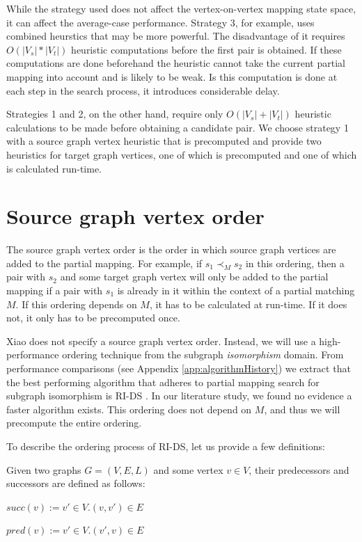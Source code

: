 While the strategy used does not affect the vertex-on-vertex mapping state space, it can affect the average-case performance. Strategy 3, for example, uses combined heurstics that may be more powerful. The disadvantage of it requires $O(|V_s|*|V_t|)$ heuristic computations before the first pair is obtained. If these computations are done beforehand the heuristic cannot take the current partial mapping into account and is likely to be weak. Is this computation is done at each step in the search process, it introduces considerable delay.

Strategies 1 and 2, on the other hand, require only $O(|V_s|+|V_t|)$ heuristic calculations to be made before obtaining a candidate pair. We choose strategy 1 with a source graph vertex heuristic that is precomputed and provide two heuristics for target graph vertices, one of which is precomputed and one of which is calculated run-time.

\section{Source graph vertex order}
\label{sec:sourceOrder}
The source graph vertex order is the order in which source graph vertices are added to the partial mapping. For example, if $s_1 \prec_M s_2$ in this ordering, then a pair with $s_2$ and some target graph vertex will only be added to the partial mapping if a pair with $s_1$ is already in it within the context of a partial matching $M$. If this ordering depends on $M$, it has to be calculated at run-time. If it does not, it only has to be precomputed once.

Xiao does not specify a source graph vertex order. Instead, we will use a high-performance ordering technique from the subgraph \textit{isomorphism} domain. From performance comparisons (see Appendix \ref{app:algorithmHistory}) we extract that the best performing algorithm that adheres to partial mapping search for subgraph isomorphism is RI-DS \cite{RIalgorithm}. In our literature study, we found no evidence a faster algorithm exists. This ordering does not depend on $M$, and thus we will precompute the entire ordering.

To describe the ordering process of RI-DS, let us provide a few definitions:

\begin{defn}
Given two graphs $G=(V, E, L)$ and some vertex $v \in V$, their predecessors and successors are defined as follows:

$\mathit{succ}(v) := {v' \in V . (v, v') \in E}$

$\mathit{pred}(v) := {v' \in V . (v', v) \in E}$
 
\end{defn}

